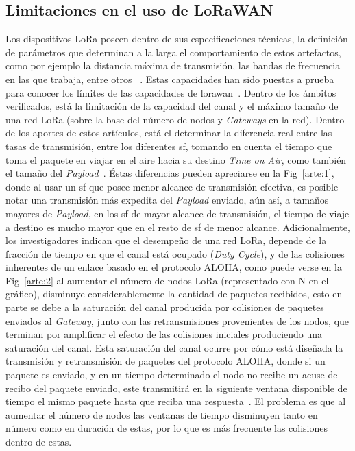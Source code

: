\begin{justify}
\section{Limitaciones en el uso de LoRaWAN}
Los dispositivos LoRa poseen dentro de sus especificaciones técnicas, la definición de parámetros que determinan a la larga el comportamiento de estos artefactos, como por ejemplo la distancia máxima de transmisión, las bandas de frecuencia en las que trabaja, entre otros ~\cite{orange}. Estas capacidades han sido puestas a prueba para conocer los límites de las capacidades de \gls{lorawan}~\cite{Xavier}. Dentro de los ámbitos verificados, está la limitación de la capacidad del canal y el máximo tamaño de una red LoRa (sobre la base del número de nodos y \textit{Gateways} en la red). Dentro de los aportes de estos artículos, está el determinar la diferencia real entre las tasas de transmisión, entre los diferentes \gls{sf}, tomando en cuenta el tiempo que toma el paquete en viajar en el aire hacia su destino \textit{Time on Air}, como también el tamaño del \textit{Payload}~\cite{Xavier}. Éstas diferencias pueden apreciarse en la Fig~\ref{arte:1}, donde al usar un \gls{sf} que posee menor alcance de transmisión efectiva, es posible notar una transmisión más expedita del \textit{Payload} enviado, aún así, a tamaños mayores de \textit{Payload}, en los \gls{sf} de mayor alcance de transmisión, el tiempo de viaje a destino es mucho mayor que en el resto de \gls{sf} de menor alcance. Adicionalmente, los investigadores indican que el desempeño de una red LoRa, depende de la fracción de tiempo en que el canal está ocupado (\textit{Duty Cycle}), y de las colisiones inherentes de un enlace basado en el protocolo ALOHA, como puede verse en la Fig~\ref{arte:2} al aumentar el número de nodos LoRa (representado con N en el gráfico), disminuye considerablemente la cantidad de paquetes recibidos, esto en parte se debe a la saturación del canal producida por colisiones de paquetes enviados al \textit{Gateway}, junto con las retransmisiones provenientes de los nodos, que terminan por amplificar el efecto de las colisiones iniciales produciendo una saturación del canal. Esta saturación del canal ocurre por cómo está diseñada la transmisión y retransmisión de paquetes del protocolo ALOHA, donde si un paquete es enviado, y en un tiempo determinado el nodo no recibe un acuse de recibo del paquete enviado, este transmitirá en la siguiente ventana disponible de tiempo el mismo paquete hasta que reciba una respuesta~\cite{NORMAN}. El problema es que al aumentar el número de nodos las ventanas de tiempo disminuyen tanto en número como en duración de estas, por lo que es más frecuente las colisiones dentro de estas.\\

\end{justify}
